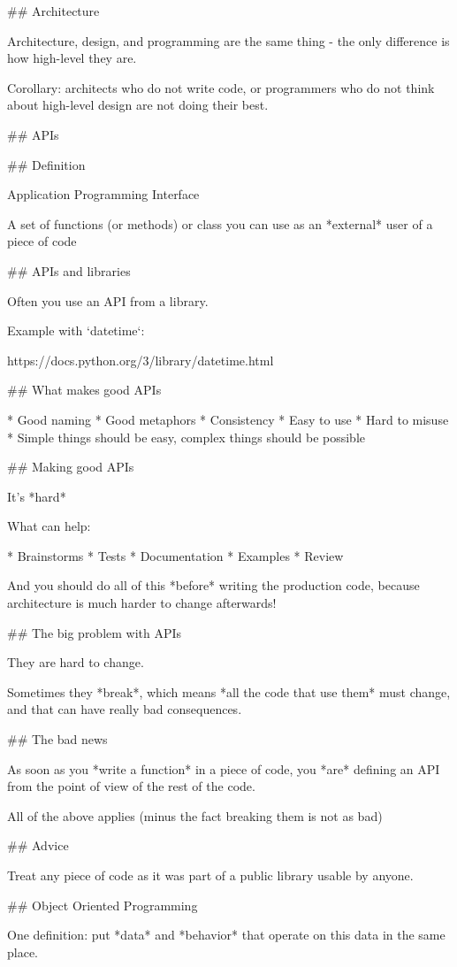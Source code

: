 ## Architecture

Architecture, design, and programming are the same thing - the only difference
is how high-level they are.

Corollary: architects who do not write code, or programmers who do not think about
high-level design are not doing their best.

##  APIs

## Definition

Application Programming Interface

A set of functions (or methods) or class you can use
as an *external* user of a piece of code

## APIs and libraries

Often you use an API from a library.

Example with `datetime`:

https://docs.python.org/3/library/datetime.html


## What makes good APIs

* Good naming
* Good metaphors
* Consistency
* Easy to use
* Hard to misuse
* Simple things should be easy, complex things should be possible


## Making good APIs

It's *hard*

What can help:

* Brainstorms
* Tests
* Documentation
* Examples
* Review

And you should do all  of this *before* writing the production code, because
architecture is much harder to change afterwards!

## The big problem with APIs

They are hard to change.

Sometimes they *break*, which means *all the code that use them* must change,
and that can have really bad consequences.

## The bad news

As soon as you *write a function* in a piece of code, you *are* defining
an API from the point of view of the rest of the code.

All of the above applies (minus the fact breaking them is not as bad)

## Advice

Treat any piece of code as it was part of a public library usable by anyone.

## Object Oriented Programming

One definition: put *data* and *behavior* that operate on this data in
the same place.

